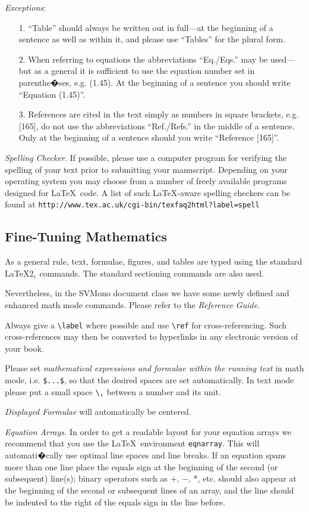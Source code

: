 \documentclass[graybox]{svmono}
\begin{document}
{\it Exceptions}:
\begin{enumerate}
\item[1.] ``Table'' should always be written out in full---at the beginning of a sentence as well as within it, and please use ``Tables'' for the plural form.
\item[2.] When referring to equations the abbreviations ``Eq./Eqs.'' may be used---but as a general it is sufficient to use the equation number set in parenthe�ses, e.g. (1.45). At the beginning of a sentence you should write ``Equation (1.45)''.
\item[3.] References are cited in the text simply as numbers in square brackets, e.g. [165], do not use the abbreviations ``Ref./Refs.'' in the middle of a sentence. Only at the beginning of a sentence should you write ``Reference [165]''.
\end{enumerate}

{\it Spelling Checker.} If possible, please use a computer program for verifying the spelling of your text prior to submitting your manuscript. Depending on your operating system you may choose from a number of freely available programs designed for \LaTeX~code. A list of such \LaTeX-aware spelling checkers can be found at {\tt http://www.tex.ac.uk/cgi-bin/texfaq2html?label=spell}

\subsection{Fine-Tuning Mathematics}
 As a general rule, text, formulae, figures, and tables are typed using the standard \LaTeX2$_\varepsilon$ commands. The standard sectioning commands are also used.

Nevertheless, in the {\sc SVMono} document class we have some newly defined and enhanced math mode commands. Please refer to the {\it Reference Guide.}

Always give a \verb|\label| where possible and use \verb|\ref| for cross-referencing. Such cross-references may then be converted to hyperlinks in any electronic version of your book.

Please set {\it mathematical expressions and formulae within the running text} in math mode, i.e. \verb|$...$|, so that the desired spaces are set automatically. In text mode please put a small space \verb|\,| between a number and its unit.

{\it Displayed Formulae} will automatically be centered.

{\it Equation Arrays.} In order to get a readable layout for your equation arrays we recommend that you use the \LaTeX~environment \verb|eqnarray|. This will automati�cally use optimal line spaces and line breaks. If an equation spans more than one line place the equals sign at the beginning of the second (or subsequent) line(s); binary operators such as $+$, $-$, *, etc. should also appear at the beginning of the second or subsequent lines of an array, and the line should be indented to the right of the equals sign in the line before.
\end{document}
